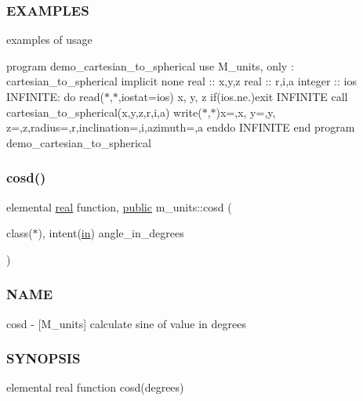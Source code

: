\subsubsection*{E\+X\+A\+M\+P\+L\+ES}

examples of usage

program demo\+\_\+cartesian\+\_\+to\+\_\+spherical use M\+\_\+units, only \+: cartesian\+\_\+to\+\_\+spherical implicit none real \+:\+: x,y,z real \+:\+: r,i,a integer \+:\+: ios I\+N\+F\+I\+N\+I\+TE\+: do read($\ast$,$\ast$,iostat=ios) x, y, z if(ios.\+ne.)exit I\+N\+F\+I\+N\+I\+TE call cartesian\+\_\+to\+\_\+spherical(x,y,z,r,i,a) write($\ast$,$\ast$)\textquotesingle{}x=\textquotesingle{},x,\textquotesingle{} y=\textquotesingle{},y,\textquotesingle{} z=\textquotesingle{},z,\textquotesingle{}radius=\textquotesingle{},r,\textquotesingle{}inclination=\textquotesingle{},i,\textquotesingle{}azimuth=\textquotesingle{},a enddo I\+N\+F\+I\+N\+I\+TE end program demo\+\_\+cartesian\+\_\+to\+\_\+spherical \mbox{\label{namespacem__units_ac02800d0ec7fcffc2fdb2a2216770678}} 
\subsubsection{\texorpdfstring{cosd()}{cosd()}}
{\footnotesize\ttfamily elemental \hyperlink{read__watch_83_8txt_abdb62bde002f38ef75f810d3a905a823}{real} function, \hyperlink{M__stopwatch_83_8txt_a2f74811300c361e53b430611a7d1769f}{public} m\+\_\+units\+::cosd (\begin{DoxyParamCaption}\item[{class($\ast$), intent(\hyperlink{M__journal_83_8txt_afce72651d1eed785a2132bee863b2f38}{in})}]{angle\+\_\+in\+\_\+degrees }\end{DoxyParamCaption})}



\subsubsection*{N\+A\+ME}

cosd -\/ \mbox{[}M\+\_\+units\mbox{]} calculate sine of value in degrees \subsubsection*{S\+Y\+N\+O\+P\+S\+IS}

elemental real function cosd(degrees)

